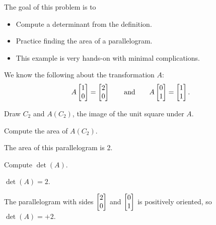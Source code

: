 	\question
	\begin{annotation}
		\begin{goals}

			The goal of this problem is to
			\begin{itemize}
				\item Compute a determinant from the definition.
				\item Practice finding the area of a parallelogram.
			\end{itemize}
		\end{goals}

		\begin{notes}
			\begin{itemize}
				\item This example is very hands-on with minimal complications.
			\end{itemize}
		\end{notes}
	\end{annotation}
	We know the following about the transformation $A$:
	\[
		A\mat{1\\0}=\mat{2\\0}\qquad\text{and}\qquad A\mat{0\\1}=\mat{1\\1}.
	\]
	\begin{parts}
		\item Draw $C_2$ and $A(C_2)$, the image of the unit square
			under $A$.
			\begin{solution}
			\end{solution}
		\item Compute the area of $A(C_2)$.
			\begin{solution}[inline]
				The area of this parallelogram is 2.
			\end{solution}
		\item Compute $\det(A)$.
			\begin{solution}
				$\det(A)=2$.

				The parallelogram with sides $\mat{2\\0}$ and $\mat{0\\1}$ is
				positively oriented, so $\det(A)=+2$.
			\end{solution}
	\end{parts}

